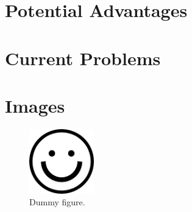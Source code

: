 \documentclass[letterpaper,12pt]{article}
\begin{document}
\section*{Potential Advantages}




\section*{Current Problems}

\section*{Images}
\begin{figure} [h]
		\centering
		\includegraphics[width=0.25\textwidth]{dummy.png}
		\caption{Dummy figure.}
		\label{fig:dummy}
\end{figure}
\end{document}
